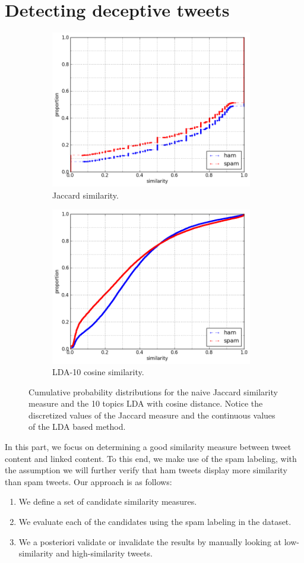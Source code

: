 \documentclass[times, 11pt, twocolumn]{article}
\begin{document}
\section{Detecting deceptive tweets}

\begin{figure}[ht]\centering
	\begin{subfigure}[c]{8.8cm}
	\includegraphics[width=8.8cm]{jacc_max.png}
	\caption{Jaccard similarity.}
	\end{subfigure}
	\begin{subfigure}[c]{8.8cm}
	\includegraphics[width=8.8cm]{cosine_lda10_max.png}
	\caption{LDA-10 cosine similarity.}
	\end{subfigure}
	\caption{Cumulative probability distributions for the
		naive Jaccard similarity measure and the 10 topics LDA
		with cosine distance. Notice the discretized values of the
		Jaccard measure and the continuous values of the LDA
	based method.}
	\label{cdfs}
\end{figure}

In this part, we focus on determining a good similarity measure between tweet content and linked content. To this end, we make use of the spam labeling, with the assumption we will further verify that ham tweets display more similarity than spam tweets. Our approach is as follows:
\begin{enumerate}
	\item We define a set of candidate similarity measures.
	\item We evaluate each of the candidates using the spam labeling in the dataset.
	\item We a posteriori validate or invalidate the results by manually looking at low-similarity and high-similarity tweets.
\end{enumerate}
\end{document}
